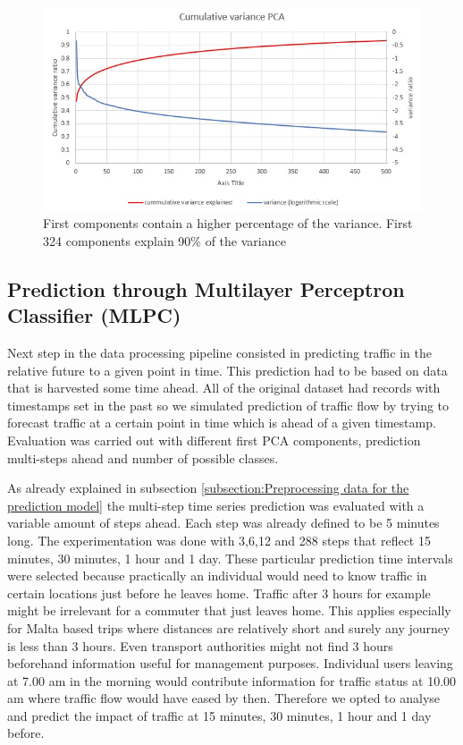 \documentclass[12pt, a4paper]{report}
\theoremstyle{definition}
\theoremstyle{definition}%
\theoremstyle{definition}%
\theoremstyle{definition}%
\theoremstyle{definition}%
\theoremstyle{definition}%
\begin{document}
\begin{figure}[h]	
	\includegraphics[scale=0.50]{cumulative_variance_pca.jpg}
	\centering
	\caption{First components contain a higher percentage of the variance. First 324 components explain 90\% of the variance }
	\label{fig:cumulative_variance_pca}
\end{figure}


%



\subsection{Prediction through Multilayer Perceptron Classifier (MLPC)}


Next step in the data processing pipeline consisted in predicting traffic in the relative future to a given point in time. This prediction had to be based on data that is harvested some time ahead. All of the original dataset had records with timestamps set  in the past so we simulated prediction of traffic flow by trying to forecast traffic at a certain point in time which is ahead of a given timestamp. Evaluation was carried out with different first PCA components, prediction multi-steps ahead and number of possible classes.

As already explained in subsection \ref{subsection:Preprocessing data for the prediction model} the multi-step time series prediction was evaluated with a variable amount of steps ahead. Each step was already defined to be 5 minutes long. The experimentation was done with 3,6,12 and 288 steps that reflect 15 minutes, 30 minutes, 1 hour and 1 day. These particular prediction time intervals were selected because practically an individual would need to know traffic in certain locations just before he leaves home. Traffic after 3 hours for example might be irrelevant for a commuter that just leaves home. This applies especially for Malta based trips where distances are relatively short and surely any journey is less than 3 hours. Even transport authorities might not find 3 hours beforehand information useful for management purposes. Individual users leaving at 7.00 am in the morning would contribute information for traffic status at 10.00 am where traffic flow would have eased by then. Therefore we opted to analyse and predict the impact of traffic at 15 minutes, 30 minutes, 1 hour and 1 day before.
\end{document}
